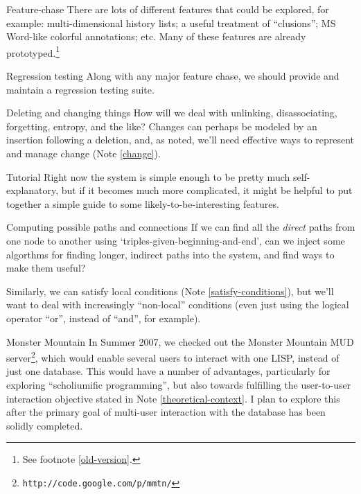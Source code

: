 \begin{notate}{Feature-chase}
There are lots of different features that could be
explored, for example: multi-dimensional history lists; a
useful treatment of ``clusions''; MS Word-like colorful
annotations; etc.  Many of these features are already
prototyped.\footnote{See footnote \ref{old-version}.}
\end{notate}

\begin{notate}{Regression testing}
Along with any major feature chase, we should provide
and maintain a regression testing suite.
\end{notate}

\begin{notate}{Deleting and changing things}
How will we deal with unlinking, disassociating,
forgetting, entropy, and the like?  Changes can perhaps
be modeled by an insertion following a deletion, and,
as noted, we'll need effective ways to represent and
manage change (Note \ref{change}).
\end{notate}

\begin{notate}{Tutorial}
Right now the system is simple enough to be pretty much
self-explanatory, but if it becomes much more complicated,
it might be helpful to put together a simple guide to some
likely-to-be-interesting features.
\end{notate}

\begin{notate}{Computing possible paths and connections}
If we can find all the \emph{direct} paths from one node
to another using `triples-given-beginning-and-end', can we
inject some algorthms for finding longer, indirect paths
into the system, and find ways to make them useful?

Similarly, we can satisfy local conditions (Note
\ref{satisfy-conditions}), but we'll want to deal with
increasingly ``non-local'' conditions (even just using the
logical operator ``or'', instead of ``and'', for example).
\end{notate}

\begin{notate}{Monster Mountain}
In Summer 2007, we checked out the Monster Mountain MUD
server\footnote{{\tt http://code.google.com/p/mmtn/}},
which would enable several users to interact with one
LISP, instead of just one database.  This would have a
number of advantages, particularly for exploring
``scholiumific programming'', but also towards fulfilling
the user-to-user interaction objective stated in Note
\ref{theoretical-context}. I plan to explore this after
the primary goal of multi-user interaction with the
database has been solidly completed.
\end{notate}

